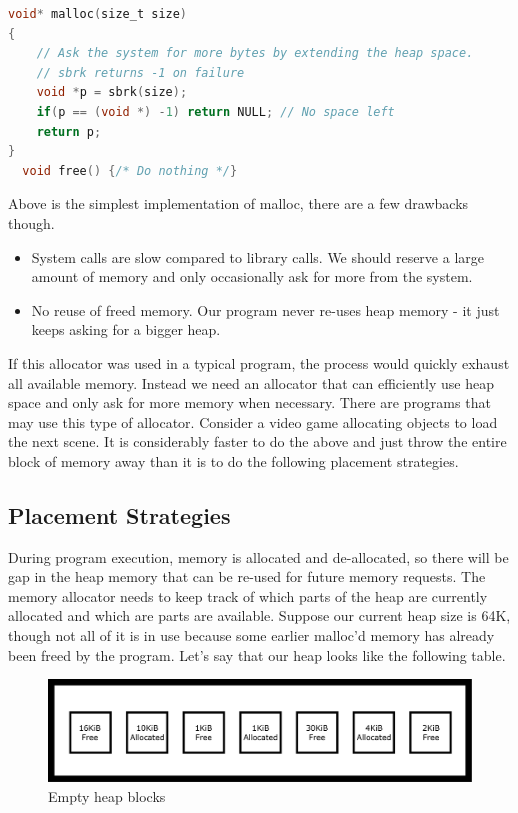 \begin{lstlisting}[language=C]
void* malloc(size_t size)
{
    // Ask the system for more bytes by extending the heap space.
    // sbrk returns -1 on failure
    void *p = sbrk(size);
    if(p == (void *) -1) return NULL; // No space left
    return p;
}
  void free() {/* Do nothing */}
\end{lstlisting}

Above is the simplest implementation of malloc, there are a few drawbacks though.

\begin{itemize}
\item System calls are slow compared to library calls.
  We should reserve a large amount of memory and only occasionally ask for more from the system.
\item No reuse of freed memory.
  Our program never re-uses heap memory - it just keeps asking for a bigger heap.
\end{itemize}

If this allocator was used in a typical program, the process would quickly exhaust all available memory.
Instead we need an allocator that can efficiently use heap space and only ask for more memory when necessary.
There are programs that may use this type of allocator.
Consider a video game allocating objects to load the next scene.
It is considerably faster to do the above and just throw the entire block of memory away than it is to do the following placement strategies.

\subsection{Placement Strategies}

During program execution, memory is allocated and de-allocated, so there will be gap in the heap memory that can be re-used for future memory requests.
The memory allocator needs to keep track of which parts of the heap are currently allocated and which are parts are available.
Suppose our current heap size is 64K, though not all of it is in use because some earlier malloc'd memory has already been freed by the program.
Let's say that our heap looks like the following table.

\begin{figure}[H]
\centering
\includegraphics[width=.9\textwidth]{malloc/drawings/heap_empty.png}
\caption{Empty heap blocks}
\end{figure}

